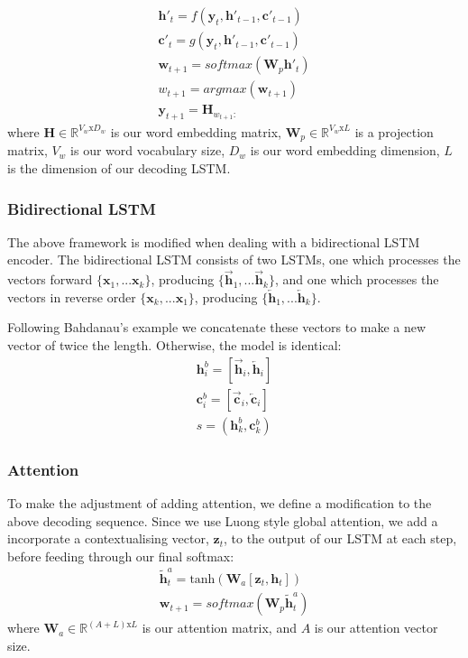 \begin{align}
    \textbf{h}'_t = f(\textbf{y}_t, \textbf{h}'_{t-1}, \textbf{c}'_{t-1}) \label{eq:s2syh}\\
    \textbf{c}'_t = g(\textbf{y}_t, \textbf{h}'_{t-1}, \textbf{c}'_{t-1}) \label{eq:s2syc} \\
    \textbf{w}_{t+1} = softmax(\textbf{W}_p\textbf{h}'_t) \label{eq:s2syw}  \\
    w_{t+1} = argmax(\textbf{w}_{t+1})  \\
    \textbf{y}_{t+1} = \textbf{H}_{w_{t+1}:}  
\end{align}
where $\textbf{H} \in \mathbb{R}^{V_w\text{x}D_w}$ is our word embedding matrix, $\textbf{W}_p \in \mathbb{R}^{V_w\text{x}L}$ is a projection matrix, $V_w$ is our word vocabulary size, $D_w$ is our word embedding dimension, $L$ is the dimension of our decoding LSTM.

\subsubsection{Bidirectional LSTM}

The above framework is modified when dealing with a bidirectional LSTM encoder. The bidirectional LSTM consists of two LSTMs, one which processes the vectors forward $\{\textbf{x}_1,...\textbf{x}_k\}$, producing  $\{\overrightarrow{\textbf{h}}_1,...\overrightarrow{\textbf{h}}_k\}$, and one which processes the vectors in reverse order  $\{\textbf{x}_k,...\textbf{x}_1\}$, producing  $\{\overleftarrow{\textbf{h}}_1,...\overleftarrow{\textbf{h}}_k\}$.

Following Bahdanau's example we concatenate these vectors to make a new vector of twice the length. Otherwise, the model is identical:
\begin{align}
\textbf{h}^b_i = [\overrightarrow{\textbf{h}}_i,\overleftarrow{\textbf{h}}_i ] \\
\textbf{c}^b_i = [\overrightarrow{\textbf{c}}_i,\overleftarrow{\textbf{c}}_i ] \\
s = (\textbf{h}^b_k, \textbf{c}^b_k)
\end{align}

\subsubsection{Attention}

To make the adjustment of adding attention, we define a modification to the above decoding sequence. Since we use Luong\cite{luong_effective_2015} style global attention, we add a incorporate a contextualising vector, $\textbf{z}_t$, to the output of our LSTM at each step, before feeding through our final softmax:
\begin{align}
    \tilde{\textbf{h}}^a_t =  \text{tanh}(\textbf{W}_a[\textbf{z}_t, \textbf{h}_t])\\
    \textbf{w}_{t+1} = softmax(\textbf{W}_p\tilde{\textbf{h}}^a_t) \label{eq:s2syw}  
\end{align}
where $\textbf{W}_a \in \mathbb{R}^{(A+L)\text{x}L} $ is our attention matrix, and $A$ is our attention vector size.

